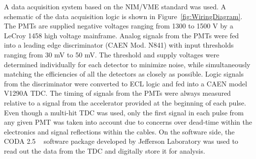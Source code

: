 \figWiringDiagramBarrier
A data acquisition system based on the NIM/VME standard was used.
A schematic of the data acquisition logic is shown in Figure~\ref{fig:WiringDiagram}.
The PMTs are supplied negative voltages ranging from 1300 to 1500 V by a LeCroy 1458 high voltage mainframe.
Analog signals from the PMTs were fed into a leading edge discriminator (CAEN Mod. N841) with input thresholds ranging from 30 mV to 50 mV.
The threshold and supply voltages were determined individually for each detector to minimize noise, while simultaneously matching the efficiencies of all the detectors as closely as possible.
Logic signals from the discriminator were converted to ECL logic and fed into a CAEN model V1290A TDC.
The timing of signals from the PMTs were always measured relative to a signal from the accelerator provided at the beginning of each pulse.
Even though a multi-hit TDC was used, only the first signal in each pulse from any given PMT was taken into account due to concerns over dead-time within the electronics and signal reflections within the cables.
On the software side, the CODA 2.5 ~\cite{CODA} software package developed by Jefferson Laboratory was used to read out the data from the TDC and digitally store it for analysis.




